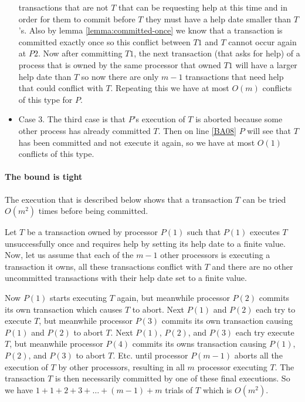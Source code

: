 \begin{proofT}
\begin{itemize}
transactions that are not $T$ that  can be requesting help at this time and
in order for them  to commit before $T$ they must have  a help date smaller
than $T$'s.
Also  by lemma  \ref{lemma:committed-once} we  know that  a  transaction is
committed exactly once  so this conflict between $T1$  and $T$ cannot occur
again at $P2$.
Now after committing  $T1$, the next transaction (that asks  for help) of a
process that  is owned by  the same processor  that owned $T1$ will  have a
larger help  date than $T$  so now there  are only $m-1$  transactions that
need help that could conflict with $T$.
Repeating this we have at most $O(m)$ conflicts of this type for $P$.
\item
Case  3. The  third case is  that $P$'s  execution of $T$  is aborted
because some other process has already committed $T$.
Then on  line \ref{BA08} $P$ will see  that $T$ has been  committed and not
execute it again, so we have at most $O(1)$ conflicts of this type.
\end{itemize}
\renewcommand{\toto}{proof:try-bounds}
\end{proofT}




\paragraph{The bound is tight}
The  execution that is described below shows that a  transaction $T$ 
can be tried  $O(m^2)$ times before being committed. 

Let  $T$ be a transaction owned by processor $P(1)$ such that 
$P(1)$ executes $T$ unsuccessfully once and requires help 
by setting its help date to a finite value. 
Now, let us assume that each of the  $m-1$ other processors  is 
executing a transaction it owns,  all  these  transactions
conflict with  $T$ and  there are no  other uncommitted  transactions with
their help date set to a finite value.
 
Now $P(1)$ starts executing $T$  again, but meanwhile processor $P(2)$ 
commits its own transaction which causes $T$ to abort. 
Next $P(1)$  and $P(2)$  each try to execute $T$, but meanwhile processor $P(3)$  
commits its own transaction causing $P(1)$ and $P(2)$ to abort $T$. 
Next $P(1)$, $P(2)$, and $P(3)$ each try execute $T$, but meanwhile processor 
$P(4)$ commits its owns transaction causing $P(1)$, $P(2)$, and $P(3)$ 
to abort  $T$. Etc.  until  processor  $P(m-1)$  aborts all  the  
execution of $T$ by  other processors, resulting in all $m$ processor 
executing $T$. The transaction $T$ is then  necessarily committed by one of 
these final executions. 
So we have $1+1+2+3+\ldots+(m-1)+m$ trials of $T$ which is  $O(m^2)$.


